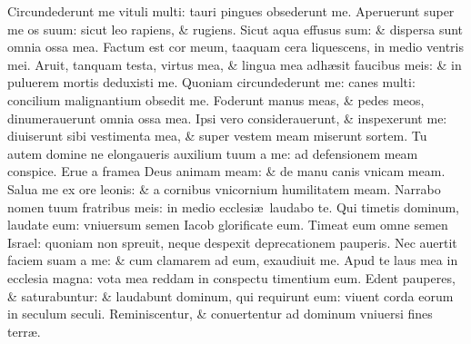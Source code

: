 \documentclass[a5paper,10pt]{book}
\def\ae{æ}
\begin{document}
\begin{multicols*}{2}
\newline \color{red} C\color{black}ircundederunt me vituli multi: tauri pingues obsederunt me.
\newline \color{red} A\color{black}peruerunt super me os suum: sicut leo rapiens, \& rugiens.
\newline \color{red} S\color{black}icut aqua effusus sum: \& dispersa sunt omnia ossa mea.
\newline \color{red} F\color{black}actum est cor meum, taaquam cera liquescens, in medio ventris mei.
\newline \color{red} A\color{black}ruit, tanquam testa, virtus mea, \& lingua mea adh\ae sit faucibus meis: \& in puluerem mortis deduxisti me.
\newline \color{red} Q\color{black}uoniam circundederunt me: canes multi: concilium malignantium obsedit me.
\newline \color{red} F\color{black}oderunt manus meas, \& pedes meos, dinumerauerunt omnia ossa mea.
\newline \color{red} I\color{black}psi vero considerauerunt, \& inspexerunt me: diuiserunt sibi vestimenta mea, \& super vestem meam miserunt sortem.
\newline \color{red} T\color{black}u autem domine ne elongaueris auxilium tuum a me: ad defensionem meam conspice.
\newline \color{red} E\color{black}rue a framea Deus animam meam: \& de manu canis vnicam meam.
\newline \color{red} S\color{black}alua me ex ore leonis: \& a cornibus vnicornium humilitatem meam.
\newline \color{red} N\color{black}arrabo nomen tuum fratribus meis: in medio ecclesi\ae \ laudabo te.
\newline \color{red} Q\color{black}ui timetis dominum, laudate eum: vniuersum semen Iacob glorificate eum.
\newline \color{red} T\color{black}imeat eum omne semen Israel: quoniam non spreuit, neque despexit deprecationem pauperis.
\newline \color{red} N\color{black}ec auertit faciem suam a me: \& cum clamarem ad eum, exaudiuit me.
\newline \color{red} A\color{black}pud te laus mea in ecclesia magna: vota mea reddam in conspectu timentium eum.
\newline \color{red} E\color{black}dent pauperes, \& saturabuntur: \& laudabunt dominum, qui requirunt eum: viuent corda eorum in seculum seculi.
\newline \color{red} R\color{black}eminiscentur, \& conuertentur ad dominum vniuersi fines terr\ae .

\end{multicols*}
\end{document}
